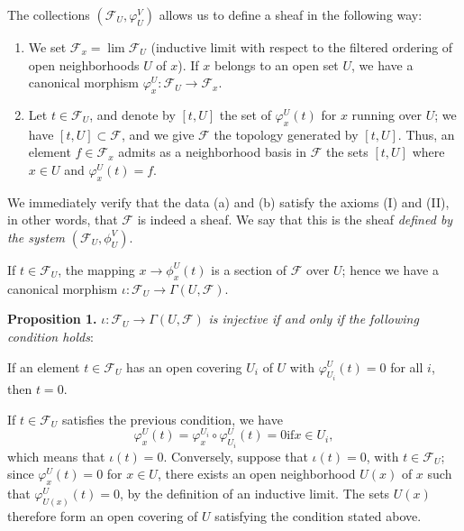 \documentclass{book}
\begin{document}
The collections $(\mathcal F_U, \varphi_U^V)$ allows us to define a sheaf in the following way:

\begin{enumerate}[label=(\alph*)]

	\item We set $\mathcal F_x = \lim \mathcal F_U$ (inductive limit with respect to the filtered ordering of open neighborhoods $U$ of $x$). If $x$ belongs to an open set $U$, we have a canonical morphism $\varphi_x^U: \mathcal F_U \rightarrow \mathcal F_x$. 

\item Let $t \in \mathcal F_U$, and denote by $[t,U]$ the set of $\varphi_x^U (t)$ for $x$ running over $U$; we have $[t,U] \subset \mathcal F$, and we give $\mathcal F$ the topology generated by $[t,U]$. Thus, an element $f \in \mathcal F_x$ admits as a neighborhood basis in $\mathcal F$ the sets $[t,U]$ where $x \in U$ and $\varphi_x^U (t) = f$. 

\end{enumerate}

We immediately verify that the data (a) and (b) satisfy the axioms (I) and (II), in other words, that $\mathcal F$ is indeed a sheaf. We say that this is the sheaf \textit{defined by the system} $(\mathcal F_U, \phi_U^V)$. 

If $t \in \mathcal F_U$, the mapping $x \rightarrow \phi_x^U (t)$ is a section of $\mathcal F$ over $U$; hence we have a canonical morphism $\iota: \mathcal F_U \rightarrow \Gamma (U, \mathcal F)$. 

\textbf{Proposition 1.} $\iota: \mathcal F_U \rightarrow \Gamma (U, \mathcal F)$ \textit{is injective if and only if the following condition holds}:

If an element $t \in \mathcal F_U$ has an open covering ${U_i}$ of $U$ with $\varphi_{U_i}^U (t) =0$ for all $i$, then $t=0$. 

If $t \in \mathcal F_U$ satisfies the previous condition, we have $$ \varphi_x^U (t) = \varphi_x^{U_i} \circ \varphi_{U_i}^U (t) =0 \text{if} x \in U_i, $$ which means that $\iota(t) =0$. Conversely, suppose that $\iota(t) =0$, with $t \in \mathcal F_U$; since $\varphi_x^U (t) =0$ for $x \in U$, there exists an open neighborhood $U(x)$ of $x$ such that $\varphi_{U(x)}^U (t) =0$, by the definition of an inductive limit. The sets $U(x)$ therefore form an open covering of $U$ satisfying the condition stated above. 
\end{document}
